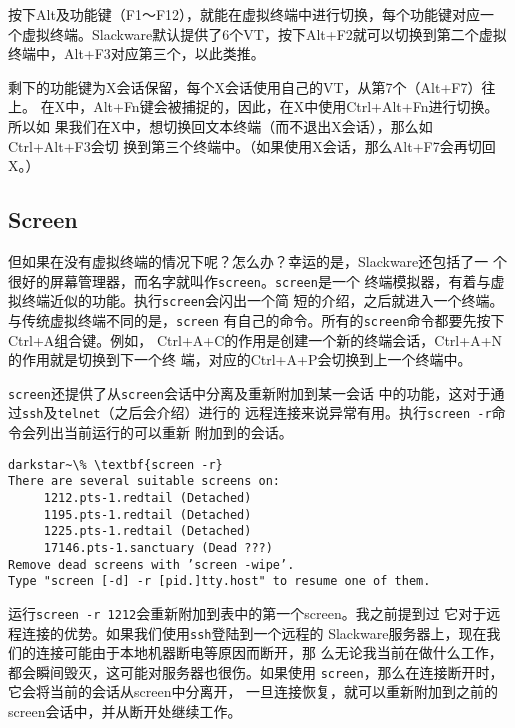 按下Alt及功能键（F1～F12），就能在虚拟终端中进行切换，每个功能键对应一
个虚拟终端。Slackware默认提供了6个VT，按下Alt+F2就可以切换到第二个虚拟
终端中，Alt+F3对应第三个，以此类推。

剩下的功能键为X会话保留，每个X会话使用自己的VT，从第7个（Alt+F7）往上。
在X中，Alt+Fn键会被捕捉的，因此，在X中使用Ctrl+Alt+Fn进行切换。所以如
果我们在X中，想切换回文本终端（而不退出X会话），那么如Ctrl+Alt+F3会切
换到第三个终端中。（如果使用X会话，那么Alt+F7会再切回X。）

\subsection{Screen}
\label{sec:shell:virtualTerminals:screen}
但如果在没有虚拟终端的情况下呢？怎么办？幸运的是，Slackware还包括了一
个很好的屏幕管理器，而名字就叫作\texttt{screen}。\texttt{screen}是一个
终端模拟器，有着与虚拟终端近似的功能。执行\texttt{screen}会闪出一个简
短的介绍，之后就进入一个终端。与传统虚拟终端不同的是，\texttt{screen}
有自己的命令。所有的\texttt{screen}命令都要先按下Ctrl+A组合键。例如，
Ctrl+A+C的作用是创建一个新的终端会话，Ctrl+A+N的作用就是切换到下一个终
端，对应的Ctrl+A+P会切换到上一个终端中。

\texttt{screen}还提供了从\texttt{screen}会话中分离及重新附加到某一会话
中的功能，这对于通过\texttt{ssh}及\texttt{telnet}（之后会介绍）进行的
远程连接来说异常有用。执行\verb|screen -r|命令会列出当前运行的可以重新
附加到的会话。

\begin{Verbatim}[frame=single, commandchars=\\\{\}]
darkstar~\% \textbf{screen -r}
There are several suitable screens on:
     1212.pts-1.redtail (Detached)
     1195.pts-1.redtail (Detached)
     1225.pts-1.redtail (Detached)
     17146.pts-1.sanctuary (Dead ???)
Remove dead screens with ’screen -wipe’.
Type "screen [-d] -r [pid.]tty.host" to resume one of them.
\end{Verbatim}
运行\verb|screen -r 1212|会重新附加到表中的第一个screen。我之前提到过
它对于远程连接的优势。如果我们使用\texttt{ssh}登陆到一个远程的
Slackware服务器上，现在我们的连接可能由于本地机器断电等原因而断开，那
么无论我当前在做什么工作，都会瞬间毁灭，这可能对服务器也很伤。如果使用
\texttt{screen}，那么在连接断开时，它会将当前的会话从screen中分离开，
一旦连接恢复，就可以重新附加到之前的screen会话中，并从断开处继续工作。


